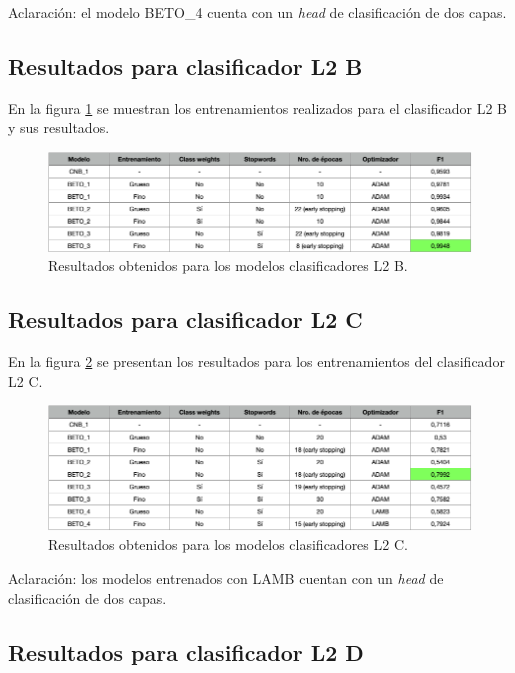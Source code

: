 Aclaración: el modelo BETO\_4 cuenta con un \textit{head} de clasificación de dos capas.

\subsection{Resultados para clasificador L2 B}

En la figura \ref{fig:res-l2b} se muestran los entrenamientos realizados para el clasificador L2 B y sus resultados.

\begin{figure}[htbp]
	\centering
	\includegraphics[width=1\textwidth]{./Figures/cap4-resultados-l2b.png}
	\caption{Resultados obtenidos para los modelos clasificadores L2 B.}
	\label{fig:res-l2b}
\end{figure}

\subsection{Resultados para clasificador L2 C}

En la figura \ref{fig:res-l2c} se presentan los resultados para los entrenamientos del clasificador L2 C.

\begin{figure}[htbp]
	\centering
	\includegraphics[width=1\textwidth]{./Figures/cap4-resultados-l2c.png}
	\caption{Resultados obtenidos para los modelos clasificadores L2 C.}
	\label{fig:res-l2c}
\end{figure}

Aclaración: los modelos entrenados con LAMB cuentan con un \textit{head} de clasificación de dos capas.

\subsection{Resultados para clasificador L2 D}

